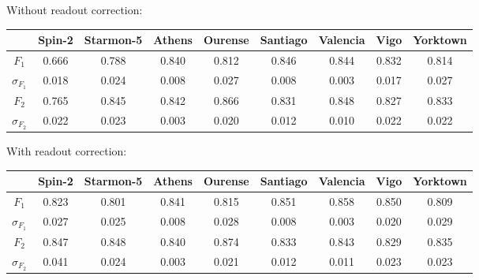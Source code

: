 Without readout correction:
\begin{table}[H]
    \centering
    \begin{tabular}{|c|c|c|c|c|c|c|c|c|}
    \hline
    \textbf{} & \textbf{Spin-2} & \textbf{Starmon-5} & \textbf{Athens} & \textbf{Ourense} & \textbf{Santiago} & \textbf{Valencia} & \textbf{Vigo} & \textbf{Yorktown} \\ \hline
    $F_1$              & 0.666  & 0.788 & 0.840 & 0.812 & 0.846 & 0.844 & 0.832 & 0.814 \\ \hline
    $\sigma_{F_1}$     & 0.018  & 0.024 & 0.008 & 0.027 & 0.008 & 0.003 & 0.017 & 0.027 \\ \hline
    $F_2$              & 0.765  & 0.845 & 0.842 & 0.866 & 0.831 & 0.848 & 0.827 & 0.833 \\ \hline
    $\sigma_{F_2}$     & 0.022  & 0.023 & 0.003 & 0.020 & 0.012 & 0.010 & 0.022 & 0.022 \\ \hline
    \end{tabular}
\end{table}

With readout correction:
\begin{table}[H]
    \centering
    \begin{tabular}{|c|c|c|c|c|c|c|c|c|}
    \hline
    \textbf{} & \textbf{Spin-2} & \textbf{Starmon-5} & \textbf{Athens} & \textbf{Ourense} & \textbf{Santiago} & \textbf{Valencia} & \textbf{Vigo} & \textbf{Yorktown} \\ \hline
    $F_1$              & 0.823 & 0.801 & 0.841 & 0.815 & 0.851 & 0.858 & 0.850 & 0.809 \\ \hline
    $\sigma_{F_1}$     & 0.027 & 0.025 & 0.008 & 0.028 & 0.008 & 0.003 & 0.020 & 0.029 \\ \hline
    $F_2$              & 0.847 & 0.848 & 0.840 & 0.874 & 0.833 & 0.843 & 0.829 & 0.835 \\ \hline
    $\sigma_{F_2}$     & 0.041 & 0.024 & 0.003 & 0.021 & 0.012 & 0.011 & 0.023 & 0.023 \\ \hline
    \end{tabular}
\end{table}